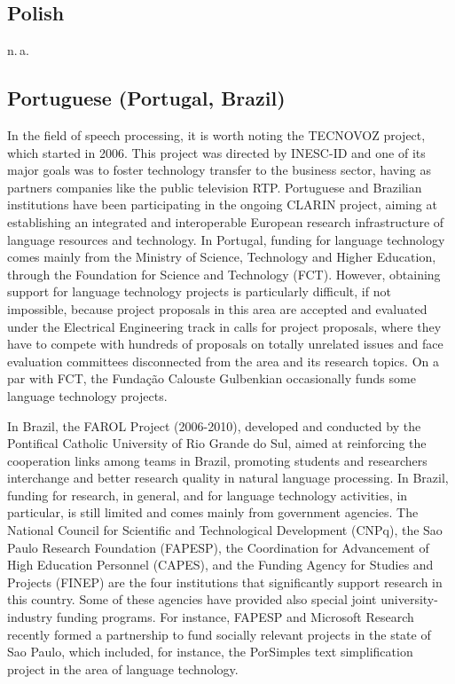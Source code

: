 \documentclass[10pt, plain]{../../metanetpaper}
\begin{document}
\begin{multicols}{2}
\begin{small}
\subsection*{Polish}
\label{sec:polish}

n.\,a.

\subsection*{Portuguese (Portugal, Brazil)}
\label{sec:port-port-braz}

In the field of speech processing, it is worth noting the TECNOVOZ project, which started in 2006. This project was directed by INESC-ID and one of its major goals was to foster technology transfer to the business sector, having as partners companies like the public television RTP.  Portuguese and Brazilian institutions have been participating in the ongoing CLARIN project, aiming at establishing an integrated and interoperable European research infrastructure of language resources and technology.  In Portugal, funding for language technology comes mainly from the Ministry of Science, Technology and Higher Education, through the Foundation for Science and Technology (FCT). However, obtaining support for language technology projects is particularly difficult, if not impossible, because project proposals in this area are accepted and evaluated under the Electrical Engineering track in calls for project proposals, where they have to compete with hundreds of proposals on totally unrelated issues and face evaluation committees disconnected from the area and its research topics. On a par with FCT, the Fundação Calouste Gulbenkian occasionally funds some language technology projects.

In Brazil, the FAROL Project (2006-2010), developed and conducted by the Pontifical Catholic University of Rio Grande do Sul, aimed at reinforcing the cooperation links among teams in Brazil, promoting students and researchers interchange and better research quality in natural language processing.  In Brazil, funding for research, in general, and for language technology activities, in particular, is still limited and comes mainly from government agencies. The National Council for Scientific and Technological Development (CNPq), the Sao Paulo Research Foundation (FAPESP), the Coordination for Advancement of High Education Personnel (CAPES), and the Funding Agency for Studies and Projects (FINEP) are the four institutions that significantly support research in this country. Some of these agencies have provided also special joint university-industry funding programs. For instance, FAPESP and Microsoft Research recently formed a partnership to fund socially relevant projects in the state of Sao Paulo, which included, for instance, the PorSimples text simplification project in the area of language technology.


\end{small}
\end{multicols}
\end{document}
